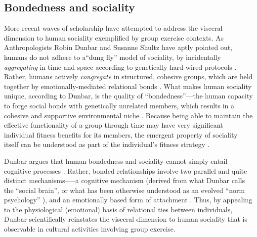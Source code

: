 \begin{CJK}{UTF8}{gbsn}
\subsection{Bondedness and sociality}
More recent waves of scholarship have attempted to address the visceral dimension to human sociality exemplified by group exercise contexts.  As Anthropologists Robin Dunbar and Susanne Shultz have aptly pointed out, humans do not adhere to a``dung fly'' model of sociality, by incidentally \textit{aggregating} in time and space according to genetically hard-wired protocols \citep[cf.][]{Wilson1975}.  Rather, humans actively \textit{congregate} in structured, cohesive groups, which are held together by emotionally-mediated relational bonds \citep[777]{Dunbar2010}.  What makes human sociality unique, according to Dunbar, is the quality of ``bondedness''---the human capacity to forge social bonds with genetically unrelated members, which results in a cohesive
and supportive environmental niche \citep[cf.][]{Odling-Smee2003}.
Because being able to maintain the effective functionality of a group through time may have very significant individual fitness benefits for its members, the emergent property of sociality itself can be understood as part of the individual’s fitness strategy \citep{Dunbar2010b,Nowak2010}.

Dunbar argues that human bondedness and sociality cannot simply entail cognitive processes \citep[at least not in the way cognitive processes are narrowly rendered by game-theoretic and gene-culture coevolutionary models][]{Dunbar2010}.  Rather, bonded relationships involve two parallel and quite distinct mechanisms—--a cognitive mechanism (derived from what Dunbar calls the ``social brain''\citep{Dunbar1998}, or what has been otherwise understood as an evolved ``norm psychology'' \citep{Chudek2011}), and an emotionally based form of attachment \citep[often involving a psycho-pharmacological mechanism][]{Dunbar2010b}.  Thus, by appealing to the physiological (emotional) basis of relational ties between individuals, Dunbar scientifically reinstates the visceral dimension to human sociality that is observable in cultural activities involving group exercise.



\end{CJK}
